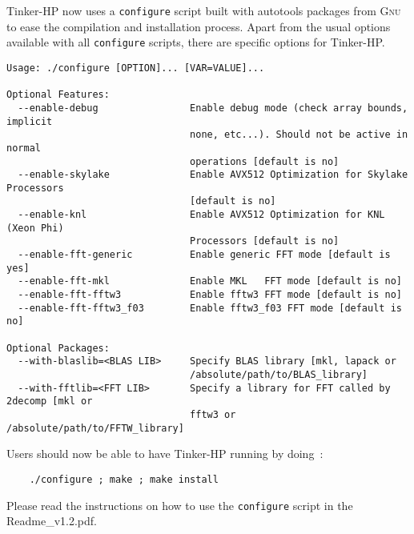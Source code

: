 \documentclass[]{article}
\begin{document}
Tinker-HP now uses a \texttt{configure} script built with  autotools packages from \textsc{Gnu} to ease the compilation and installation process. Apart from the usual options available with all \texttt{configure} scripts, there are specific options for Tinker-HP.


\begin{verbatim}
Usage: ./configure [OPTION]... [VAR=VALUE]...

Optional Features:
  --enable-debug                Enable debug mode (check array bounds, implicit
                                none, etc...). Should not be active in normal
                                operations [default is no]
  --enable-skylake              Enable AVX512 Optimization for Skylake Processors
                                [default is no]
  --enable-knl                  Enable AVX512 Optimization for KNL (Xeon Phi)
                                Processors [default is no]
  --enable-fft-generic          Enable generic FFT mode [default is yes]
  --enable-fft-mkl              Enable MKL   FFT mode [default is no]
  --enable-fft-fftw3            Enable fftw3 FFT mode [default is no]
  --enable-fft-fftw3_f03        Enable fftw3_f03 FFT mode [default is no]

Optional Packages:
  --with-blaslib=<BLAS LIB>     Specify BLAS library [mkl, lapack or 
                                /absolute/path/to/BLAS_library]
  --with-fftlib=<FFT LIB>       Specify a library for FFT called by 2decomp [mkl or
                                fftw3 or /absolute/path/to/FFTW_library]

\end{verbatim}

Users should now be able to have Tinker-HP running by doing~:
\begin{verbatim}
    ./configure ; make ; make install
\end{verbatim}

Please read the instructions on how to use the \texttt{configure} script in the Readme\_v1.2.pdf.
\end{document}
